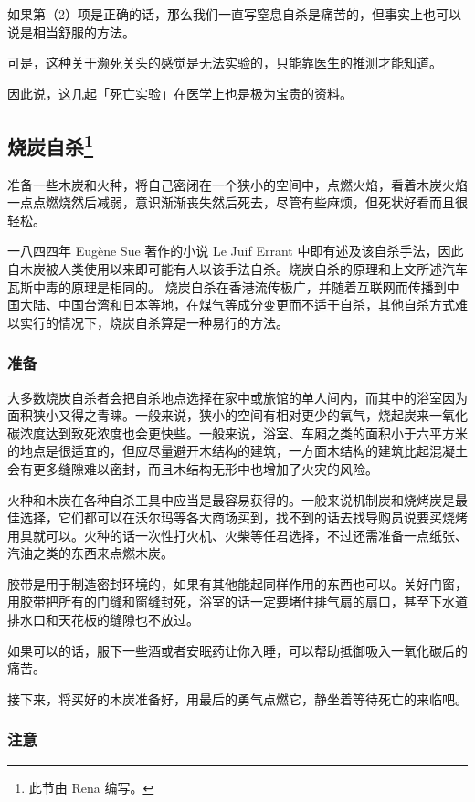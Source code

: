 \documentclass[UTF8]{ctexart}
\begin{document}
如果第（2）项是正确的话，那么我们一直写窒息自杀是痛苦的，但事实上也可以说是相当舒服的方法。

可是，这种关于濒死关头的感觉是无法实验的，只能靠医生的推测才能知道。 

因此说，这几起「死亡实验」在医学上也是极为宝贵的资料。

\subsection*{烧炭自杀\footnote{此节由 Rena 编写。}}

准备一些木炭和火种，将自己密闭在一个狭小的空间中，点燃火焰，看着木炭火焰一点点燃烧然后减弱，意识渐渐丧失然后死去，尽管有些麻烦，但死状好看而且很轻松。

一八四四年 Eugène Sue 著作的小说 Le Juif Errant 中即有述及该自杀手法，因此自木炭被人类使用以来即可能有人以该手法自杀。烧炭自杀的原理和上文所述汽车瓦斯中毒的原理是相同的。
烧炭自杀在香港流传极广，并随着互联网而传播到中国大陆、中国台湾和日本等地，在煤气等成分变更而不适于自杀，其他自杀方式难以实行的情况下，烧炭自杀算是一种易行的方法。

\subsubsection*{准备}

大多数烧炭自杀者会把自杀地点选择在家中或旅馆的单人间内，而其中的浴室因为面积狭小又得之青睐。一般来说，狭小的空间有相对更少的氧气，烧起炭来一氧化碳浓度达到致死浓度也会更快些。一般来说，浴室、车厢之类的面积小于六平方米的地点是很适宜的，但应尽量避开木结构的建筑，一方面木结构的建筑比起混凝土会有更多缝隙难以密封，而且木结构无形中也增加了火灾的风险。

火种和木炭在各种自杀工具中应当是最容易获得的。一般来说机制炭和烧烤炭是最佳选择，它们都可以在沃尔玛等各大商场买到，找不到的话去找导购员说要买烧烤用具就可以。火种的话一次性打火机、火柴等任君选择，不过还需准备一点纸张、汽油之类的东西来点燃木炭。

胶带是用于制造密封环境的，如果有其他能起同样作用的东西也可以。关好门窗，用胶带把所有的门缝和窗缝封死，浴室的话一定要堵住排气扇的扇口，甚至下水道排水口和天花板的缝隙也不放过。

如果可以的话，服下一些酒或者安眠药让你入睡，可以帮助抵御吸入一氧化碳后的痛苦。

接下来，将买好的木炭准备好，用最后的勇气点燃它，静坐着等待死亡的来临吧。

\subsubsection*{注意}
\end{document}
